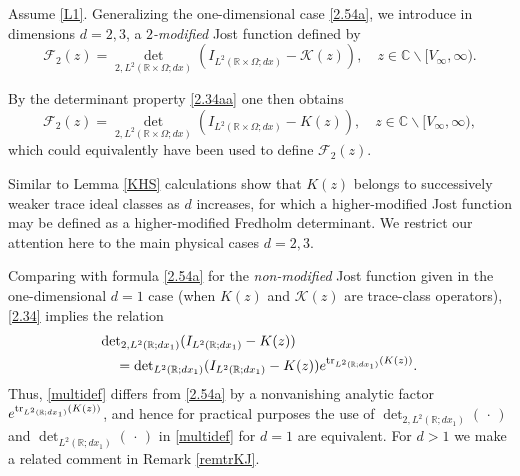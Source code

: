 \begin{definition}\label{multievans}
Assume \eqref{L1}. 
Generalizing the one-dimensional case \eqref{2.54a}, we introduce in
dimensions $d=2,3$, a {\em $2$-modified} Jost function defined by 
\begin{equation}\label{multidef}
{{\mathcal F}}_2(z)= {\det}_{2,L^2({{\mathbb{R}}}\times\Omega; d x)}
(I_{L^2({{\mathbb{R}}}\times\Omega; d x)}- {{\mathcal K}}(z)), \quad z\in{{\mathbb{C}}}\backslash[V_\infty,\infty). 
\end{equation}
\end{definition}

By the determinant property \eqref{2.34aa} one then obtains
\begin{equation}
{{\mathcal F}}_2(z)= {\det}_{2,L^2({{\mathbb{R}}}\times\Omega; d x)}
(I_{L^2({{\mathbb{R}}}\times\Omega; d x)}- K(z)), \quad z\in{{\mathbb{C}}}\backslash[V_\infty,\infty), 
\end{equation}
which could equivalently have been used to define ${{\mathcal F}}_2(z)$.

\begin{remark}
Similar to Lemma \ref{KHS} calculations show that $K(z)$ belongs to
successively weaker trace ideal classes as $d$ increases, for
which a higher-modified Jost function may be defined as a higher-modified
Fredholm determinant.
We restrict our attention here to the main physical cases $d=2,3$.
\end{remark}

\begin{remark}\label{factor}
Comparing with formula \eqref{2.54a}  for the {\em non-modified}
Jost function given in
the one-dimensional $d=1$ case (when $K(z)$
and ${{\mathcal K}}(z)$ are trace-class operators), \eqref{2.34} implies the relation
\begin{align}\label{4.21old}
\begin{split}
& {\det}_{2,L^2({{\mathbb{R}}}; dx_1)} (I_{L^2({{\mathbb{R}}}; dx_1)}- K(z))  \\
& \quad ={\det}_{L^2({{\mathbb{R}}}; dx_1)} (I_{L^2({{\mathbb{R}}}; dx_1)}- K(z))
e^{{\text{\rm{tr}}}_{L^2({{\mathbb{R}}}; dx_1)} (K(z))}.
\end{split}
\end{align}
Thus, \eqref{multidef}
differs from \eqref{2.54a} by a nonvanishing analytic factor
$e^{{\text{\rm{tr}}}_{L^2({{\mathbb{R}}}; dx_1)} (K(z))}$,
and hence for practical purposes the
use of ${\det}_{2,L^2({{\mathbb{R}}}; dx_1)}({\,\cdot\,})$
and ${\det}_{L^2({{\mathbb{R}}}; dx_1)}({\,\cdot\,})$ in
\eqref{multidef} for $d=1$ are equivalent.
For $d>1$ we make a related
comment in Remark \ref{remtrKJ}.
\end{remark}

